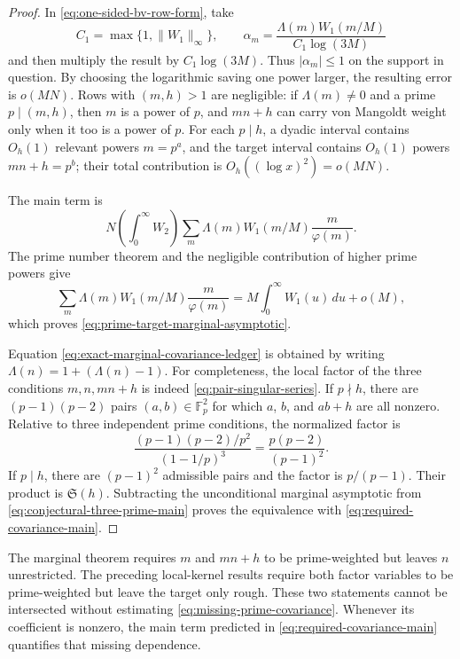\begin{proof}
In \eqref{eq:one-sided-bv-row-form}, take
\[
 C_1=\max\{1,\lVert W_1\rVert_\infty\},
 \qquad
 \alpha_m=\frac{\Lambda(m)W_1(m/M)}{C_1\log(3M)}
\]
and then multiply the result by $C_1\log(3M)$.  Thus
$|\alpha_m|\leq1$ on the support in question.  By choosing the logarithmic
saving one power larger, the resulting error is $o(MN)$.  Rows with
$(m,h)>1$ are negligible: if $\Lambda(m)\ne0$ and a prime $p\mid(m,h)$,
then $m$ is a power of $p$, and $mn+h$ can carry von Mangoldt weight only
when it too is a power of $p$.  For each $p\mid h$, a dyadic interval
contains $O_h(1)$ relevant powers $m=p^a$, and the target interval contains
$O_h(1)$ powers $mn+h=p^b$; their total contribution is
$O_h((\log x)^2)=o(MN)$.

The main term is
\[
 N\left(\int_0^\infty W_2\right)
 \sum_m\Lambda(m)W_1(m/M)\frac{m}{\varphi(m)}.
\]
The prime number theorem and the negligible contribution of higher prime
powers give
\[
 \sum_m\Lambda(m)W_1(m/M)\frac{m}{\varphi(m)}
 =M\int_0^\infty W_1(u)\,du+o(M),
\]
which proves \eqref{eq:prime-target-marginal-asymptotic}.

Equation \eqref{eq:exact-marginal-covariance-ledger} is obtained by writing
$\Lambda(n)=1+(\Lambda(n)-1)$.  For completeness, the local factor of the
three conditions $m,n,mn+h$ is indeed \eqref{eq:pair-singular-series}.  If
$p\nmid h$, there are $(p-1)(p-2)$ pairs $(a,b)\in\mathbb F_p^2$ for which
$a$, $b$, and $ab+h$ are all nonzero.  Relative to three independent prime
conditions, the normalized factor is
\[
 \frac{(p-1)(p-2)/p^2}{(1-1/p)^3}
 =\frac{p(p-2)}{(p-1)^2}.
\]
If $p\mid h$, there are $(p-1)^2$ admissible pairs and the factor is
$p/(p-1)$.  Their product is $\mathfrak S(h)$.  Subtracting the unconditional
marginal asymptotic from \eqref{eq:conjectural-three-prime-main} proves the
equivalence with \eqref{eq:required-covariance-main}.
\end{proof}

\begin{remark}
\label{rem:marginals-do-not-intersect}
The marginal theorem requires $m$ and $mn+h$ to be prime-weighted but leaves
$n$ unrestricted.  The preceding local-kernel results require both factor
variables to be prime-weighted but leave the target only rough.  These two
statements cannot be intersected without estimating
\eqref{eq:missing-prime-covariance}.  Whenever its coefficient is nonzero,
the main term predicted in \eqref{eq:required-covariance-main} quantifies that
missing dependence.
\end{remark}

